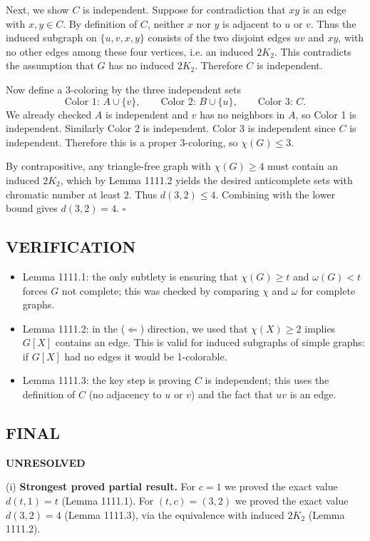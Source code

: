 Next, we show $C$ is independent. Suppose for contradiction that $xy$ is an edge with $x,y\in C$.
By definition of $C$, neither $x$ nor $y$ is adjacent to $u$ or $v$.
Thus the induced subgraph on $\{u,v,x,y\}$ consists of the two disjoint edges $uv$ and $xy$, with no other edges among these four vertices, i.e. an induced $2K_2$.
This contradicts the assumption that $G$ has no induced $2K_2$. Therefore $C$ is independent.

Now define a 3-coloring by the three independent sets
\[\text{Color 1: } A\cup\{v\},\qquad \text{Color 2: } B\cup\{u\},\qquad \text{Color 3: } C.
\]
We already checked $A$ is independent and $v$ has no neighbors in $A$, so Color 1 is independent.
Similarly Color 2 is independent.
Color 3 is independent since $C$ is independent.
Therefore this is a proper 3-coloring, so $\chi(G)\le 3$.

By contrapositive, any triangle-free graph with $\chi(G)\ge 4$ must contain an induced $2K_2$, which by Lemma 1111.2 yields the desired anticomplete sets with chromatic number at least $2$.
Thus $d(3,2)\le 4$.
Combining with the lower bound gives $d(3,2)=4$. \hfill $\square$

\subsection*{VERIFICATION}
\begin{itemize}
\item Lemma 1111.1: the only subtlety is ensuring that $\chi(G)\ge t$ and $\omega(G)<t$ forces $G$ not complete; this was checked by comparing $\chi$ and $\omega$ for complete graphs.
\item Lemma 1111.2: in the ($\Leftarrow$) direction, we used that $\chi(X)\ge 2$ implies $G[X]$ contains an edge. This is valid for induced subgraphs of simple graphs: if $G[X]$ had no edges it would be 1-colorable.
\item Lemma 1111.3: the key step is proving $C$ is independent; this uses the definition of $C$ (no adjacency to $u$ or $v$) and the fact that $uv$ is an edge.
\end{itemize}

\subsection*{FINAL}
\textbf{UNRESOLVED}

(i) \textbf{Strongest proved partial result.}
For $c=1$ we proved the exact value $d(t,1)=t$ (Lemma 1111.1).
For $(t,c)=(3,2)$ we proved the exact value $d(3,2)=4$ (Lemma 1111.3), via the equivalence with induced $2K_2$ (Lemma 1111.2).


